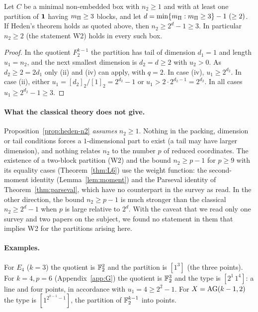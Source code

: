 \begin{proposition}\label{prop:heden-n2}
Let $C$ be a minimal non-embedded box with $n_2\ge1$ and with at least one partition of $\mathbf 1$ having $m_\Pi\ge3$ blocks, and let $d=\min\{m_\Pi:m_\Pi\ge3\}-1\ (\ge2)$. If Heden's theorem holds as quoted above, then $n_2\ge2^{d}-1\ge3$. In particular $n_2\ge2$ (the statement W2) holds in every such box.
\end{proposition}

\begin{proof}
In the quotient $F_2^{k-1}$ the partition has tail of dimension $d_1=1$ and length $u_1=n_2$, and the next smallest dimension is $d_2=d\ge2$ with $u_2>0$. As $d_2\ge2=2d_1$ only (ii) and (iv) can apply, with $q=2$. In case (iv), $u_1\ge2^{d_2}$. In case (ii), either $u_1=[d_2]_2/[1]_2=2^{d_2}-1$ or $u_1>2\cdot2^{d_2-1}=2^{d_2}$. In all cases $u_1\ge2^{d_2}-1\ge3$.
\end{proof}


\paragraph{What the classical theory does not give.} Proposition~\ref{prop:heden-n2} \emph{assumes} $n_2\ge1$. Nothing in the packing, dimension or tail conditions forces a $1$-dimensional part to exist (a tail may have larger dimension), and nothing relates $n_2$ to the number $p$ of reduced coordinates. The existence of a two-block partition (W2) and the bound $n_2\ge p-1$ for $p\ge9$ with its equality cases (Theorem~\ref{thm:L6}) use the weight function: the second-moment identity (Lemma~\ref{lem:moment}) and the Parseval identity of Theorem~\ref{thm:parseval}, which have no counterpart in the survey as read. In the other direction, the bound $n_2\ge p-1$ is much stronger than the classical $n_2\ge2^d-1$ when $p$ is large relative to $2^d$. With the caveat that we read only one survey and two papers on the subject, we found no statement in them that implies W2 for the partitions arising here.

\paragraph{Examples.} For $E_4$ ($k=3$) the quotient is $\mathbb F_2^2$ and the partition is $[1^3]$ (the three points). For $k=4,p=6$ (Appendix~\ref{app:G}) the quotient is $\mathbb F_2^3$ and the type is $[2^1\,1^4]$: a line and four points, in accordance with $u_1=4\ge2^2-1$. For $X=\mathrm{AG}(k-1,2)$ the type is $[1^{2^{k-1}-1}]$, the partition of $\mathbb F_2^{k-1}$ into points.


